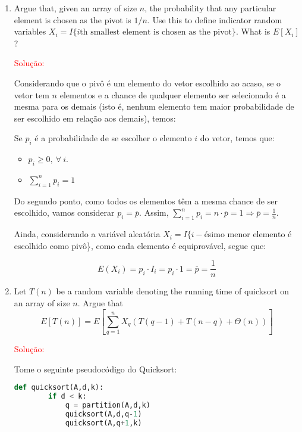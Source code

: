 \documentclass{article}
\begin{document}
\begin{enumerate}[label=(\alph*)]

\vspace{\baselineskip}
  \item Argue that, given an array of size $n$, the probability that any particular element is chosen as the pivot is $1/n$. Use this to define indicator random variables $X_i = I \{i\mbox{th smallest element is chosen as the pivot}\}$. What is $E[X_i]$?
  
  \textcolor{red}{Solução: }
  
  Considerando que o pivô é um elemento do vetor escolhido ao acaso, se o vetor tem $n$ elementos e a chance de qualquer elemento ser selecionado é a mesma para os demais (isto é, nenhum elemento tem maior probabilidade de ser escolhido em relação aos demais), temos: 
  
  Se $p_i$ é a probabilidade de se escolher o elemento $i$ do vetor, temos que:
  
  \begin{itemize}
      \item $p_i \geq 0,~\forall~i$. 
      \item $\sum_{i=1}^{n} p_i = 1$
  \end{itemize}
  
  Do segundo ponto, como todos os elementos têm a mesma chance de ser escolhido, vamos considerar $p_i = \overline{p}$. Assim, $\sum_{i=1}^{n} p_i = n \cdot \overline{p} = 1 \Rightarrow{} \overline{p} = \frac{1}{n}$. 
  
  Ainda, considerando a variável aleatória $X_i = I\{i-$ésimo menor elemento é escolhido como pivô\}, como cada elemento é equiprovável, segue que:
  
  $$ 
  E(X_i) = p_i \cdot I_i = p_i \cdot 1 = \overline{p} = \frac{1}{n}
  $$
  
\vspace{\baselineskip} 
  \item Let $T(n)$ be a random variable denoting the running time of quicksort on an array of size $n$. Argue that
  \begin{equation}
    E[T(n)]=E\left[\sum_{q=1}^{n}X_q(T(q-1)+T(n-q)+\Theta(n))\right]  
    \label{eq:1}
  \end{equation}
  
  \textcolor{red}{Solução: }
  
  Tome o seguinte pseudocódigo do Quicksort: 
  
  \begin{lstlisting}[language=Python]
  def quicksort(A,d,k):
        if d < k:
            q = partition(A,d,k)
            quicksort(A,d,q-1)
            quicksort(A,q+1,k)
  \end{lstlisting}
  

\end{enumerate}
\end{document}
